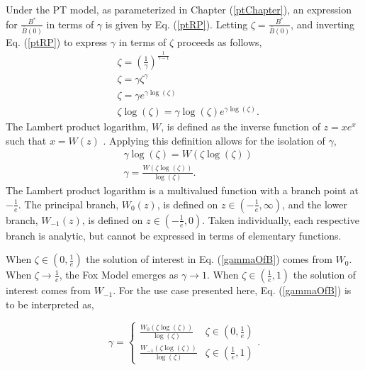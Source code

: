 Under the PT model, as parameterized in Chapter (\ref{ptChapter}), an
expression for $\frac{B^*}{\bar B(0)}$ in terms of $\gamma$ is given by 
Eq. (\ref{ptRP}). Letting $\zeta=\frac{B^*}{\bar B(0)}$, and inverting 
Eq. (\ref{ptRP}) to express $\gamma$ in terms of $\zeta$ proceeds as follows,
\begin{align*}
&\zeta=\left(\frac{1}{\gamma}\right)^{\frac{1}{\gamma-1}}\\
&\zeta=\gamma\zeta^{\gamma}\\
&\zeta=\gamma e^{\gamma\log(\zeta)}\\
&\zeta\log(\zeta)=\gamma\log(\zeta) e^{\gamma\log(\zeta)}.
\end{align*}
The Lambert product logarithm, $W$, is defined as the inverse function of $z=xe^x$ such that $x=W(z)$ \cite{lehtonen_lambert_2016, corless_lambertw_1996}.
Applying this definition allows for the isolation of $\gamma$,
\begin{align}
&\gamma\log(\zeta)=W\left(\zeta\log(\zeta)\right) \nonumber\\
&\gamma=\frac{W\left(\zeta\log(\zeta)\right)}{\log(\zeta)}. \label{gammaOfZeta}
\end{align}
The Lambert product logarithm is a multivalued function with a branch point at
$-\frac{1}{e}$. The principal branch, $W_0(z)$, is defined on $z\in\left(-\frac{1}{e}, \infty\right)$,
and the lower branch, $W_{-1}(z)$, is defined on $z\in\left(-\frac{1}{e}, 0\right)$. Taken
individually, each respective branch is analytic, but cannot be expressed in terms
of elementary functions.

%
When $\zeta\in\left(0, \frac{1}{e}\right)$ the solution of interest in Eq. (\ref{gammaOfB})
comes from $W_0$. %
When $\zeta\to\frac{1}{e}$, the Fox Model emerges as $\gamma\to1$.
When $\zeta\in\left(\frac{1}{e}, 1\right)$ the solution of interest comes from
$W_{-1}$. For the use case presented here, Eq. (\ref{gammaOfB}) is to be interpreted as,

\begin{equation}
\gamma = 
\begin{cases} 
\frac{W_0\left(\zeta\log\left(\zeta\right)\right)}{\log\left(\zeta\right)} & \zeta\in\left(0, \frac{1}{e}\right)\\
\frac{W_{-1}\left(\zeta\log\left(\zeta\right)\right)}{\log\left(\zeta\right)} & \zeta\in\left(\frac{1}{e}, 1\right)
\end{cases}. 
\end{equation} 



